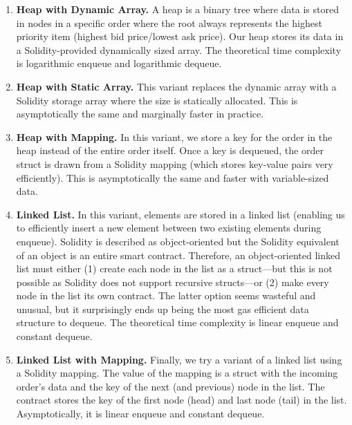 \begin{enumerate}

\item \textbf{Heap with Dynamic Array.} A heap is a binary tree where data is stored in nodes in a specific order where the root always represents the highest priority item (\ie highest bid price/lowest ask price). Our heap stores its data in a Solidity-provided dynamically sized array. The theoretical time complexity is logarithmic enqueue and logarithmic dequeue.

\item \textbf{Heap with Static Array.} This variant replaces the dynamic array with a Solidity storage array where the size is statically allocated. This is asymptotically the same and marginally faster in practice.  %

\item \textbf{Heap with Mapping.} In this variant, we store a key for the order in the heap instead of the entire order itself. Once a key is dequeued, the order struct is drawn from a Solidity mapping (which stores key-value pairs very efficiently). This is asymptotically the same and faster with variable-sized data. 

\item \textbf{Linked List.} In this variant, elements are stored in a linked list (enabling us to efficiently insert a new element between two existing elements during enqueue). Solidity is described as object-oriented but the Solidity equivalent of an object is an entire smart contract. Therefore, an object-oriented linked list must either (1) create each node in the list as a struct---but this is not possible as Solidity does not support recursive structs---or (2) make every node in the list its own contract. The latter option seems wasteful and unusual, but it surprisingly ends up being the most gas efficient data structure to dequeue. The theoretical time complexity is linear enqueue and constant dequeue.

\item \textbf{Linked List with Mapping.} Finally, we try a variant of a linked list using a Solidity mapping. The value of the mapping is a struct with the incoming order's data and the key of the next (and previous) node in the list. The contract stores the key of the first node (head) and last node (tail) in the list. Asymptotically, it is linear enqueue and constant dequeue. 

\end{enumerate}


